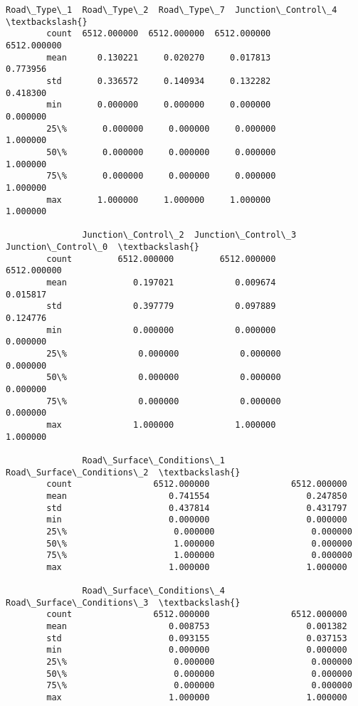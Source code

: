 \documentclass[11pt]{article}
\begin{document}
\begin{Verbatim}[commandchars=\\\{\}]
               Road\_Type\_1  Road\_Type\_2  Road\_Type\_7  Junction\_Control\_4  \textbackslash{}
        count  6512.000000  6512.000000  6512.000000         6512.000000   
        mean      0.130221     0.020270     0.017813            0.773956   
        std       0.336572     0.140934     0.132282            0.418300   
        min       0.000000     0.000000     0.000000            0.000000   
        25\%       0.000000     0.000000     0.000000            1.000000   
        50\%       0.000000     0.000000     0.000000            1.000000   
        75\%       0.000000     0.000000     0.000000            1.000000   
        max       1.000000     1.000000     1.000000            1.000000   
        
               Junction\_Control\_2  Junction\_Control\_3  Junction\_Control\_0  \textbackslash{}
        count         6512.000000         6512.000000         6512.000000   
        mean             0.197021            0.009674            0.015817   
        std              0.397779            0.097889            0.124776   
        min              0.000000            0.000000            0.000000   
        25\%              0.000000            0.000000            0.000000   
        50\%              0.000000            0.000000            0.000000   
        75\%              0.000000            0.000000            0.000000   
        max              1.000000            1.000000            1.000000   
        
               Road\_Surface\_Conditions\_1  Road\_Surface\_Conditions\_2  \textbackslash{}
        count                6512.000000                6512.000000   
        mean                    0.741554                   0.247850   
        std                     0.437814                   0.431797   
        min                     0.000000                   0.000000   
        25\%                     0.000000                   0.000000   
        50\%                     1.000000                   0.000000   
        75\%                     1.000000                   0.000000   
        max                     1.000000                   1.000000   
        
               Road\_Surface\_Conditions\_4  Road\_Surface\_Conditions\_3  \textbackslash{}
        count                6512.000000                6512.000000   
        mean                    0.008753                   0.001382   
        std                     0.093155                   0.037153   
        min                     0.000000                   0.000000   
        25\%                     0.000000                   0.000000   
        50\%                     0.000000                   0.000000   
        75\%                     0.000000                   0.000000   
        max                     1.000000                   1.000000   
        

\end{Verbatim}
\end{document}
